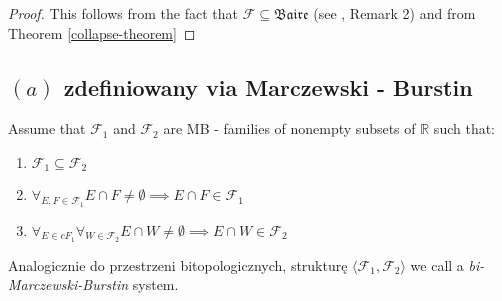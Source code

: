 \documentclass[12pt]{amsart}
\theoremstyle{plain}
\theoremstyle{definition}
\theoremstyle{remark}
\newcommand{\Baire}{\mathfrak{Baire}}
\newcommand{\real}{\mathbb{R}}
\newcommand{\cF}{{\mathcal F}}
\newcommand{\aideal}{\mathit{(a)}}
\newcommand{\biMB}{bi-Marczewski-Burstin}
\begin{document}
\begin{proof}
This follows from the fact that $\cF \subseteq \Baire$ (see \cite{PWBW}, Remark 2) and
from Theorem \ref{collapse-theorem}
\end{proof}




\subsection{$\aideal$ zdefiniowany via Marczewski - Burstin}

Assume that $\cF_1$ and $\cF_2$ are MB - families of nonempty 
subsets of $\real$ such that:
\begin{enumerate}	
\item
\label{mb-condition-subset}
  $\cF_1 \subseteq \cF_2$
\item 
\label{mb-condition-f1}
  $\forall_{E,F \in \cF_1} E \cap F \not= \emptyset \implies E \cap F \in \cF_1$
\item
\label{mb-condition-f1f2}
  $\forall_{E \in cF_1} \forall_{W \in \cF_2} E \cap W \not= \emptyset \implies E \cap W \in \cF_2$  
\end{enumerate}	

Analogicznie do przestrzeni bitopologicznych, strukturę
$\langle \cF_1, \cF_2 \rangle$ we call a {\it\biMB} system.
\end{document}
